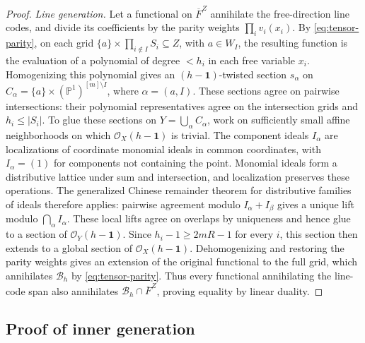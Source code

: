 \documentclass[11pt,letterpaper]{article}
\renewcommand{\le}{\leqslant}
\renewcommand{\ge}{\geqslant}
\theoremstyle{definition}
\theoremstyle{remark}
\newcommand{\PP}{\mathbb P}
\newcommand{\cB}{\mathcal B}
\begin{document}
\begin{proof}
\emph{Line generation.}
Let a functional on \(\overline F^Z\) annihilate the free-direction
line codes, and divide its coefficients by the parity weights
\(\prod_i v_i(x_i)\).
By \eqref{eq:tensor-parity}, on each grid
\(\{a\}\times\prod_{i\notin I}S_i\subseteq Z\), with \(a\in W_I\),
the resulting function is the evaluation of a polynomial
of degree \(<h_i\) in each free variable \(x_i\).
Homogenizing this polynomial gives an \((h-\mathbf1)\)-twisted
section \(s_\alpha\) on
\(C_\alpha=\{a\}\times(\PP^1)^{[m]\setminus I}\),
where \(\alpha=(a,I)\).
These sections agree on pairwise intersections:
their polynomial representatives agree on the intersection
grids and \(h_i\le |S_i|\).
To glue these sections on \(Y=\bigcup_\alpha C_\alpha\),
work on sufficiently small affine neighborhoods on which
\(\mathcal O_X(h-\mathbf1)\) is trivial. The component ideals
\(I_\alpha\) are localizations of coordinate monomial ideals
in common coordinates, with \(I_\alpha=(1)\) for components
not containing the point.
Monomial ideals form a distributive lattice under sum and
intersection, and localization preserves these operations.
The generalized Chinese remainder theorem for distributive
families of ideals therefore applies: pairwise agreement modulo
\(I_\alpha+I_\beta\) gives a unique lift modulo
\(\bigcap_\alpha I_\alpha\).
These local lifts agree on overlaps by uniqueness and hence
glue to a section of \(\mathcal O_Y(h-\mathbf1)\).
Since \(h_i-1\ge 2mR-1\) for every \(i\), this section then extends to a global section of
\(\mathcal O_X(h-\mathbf1)\).
Dehomogenizing and restoring the parity weights gives an
extension of the original functional to the full grid,
which annihilates \(\cB_h\) by \eqref{eq:tensor-parity}.
Thus every functional annihilating the line-code span also
annihilates \(\cB_h\cap\overline F^Z\), proving equality by linear duality.
\end{proof}


\subsection{Proof of inner generation}
\label{sec:expansion}
\label{sec:B4}
\end{document}
